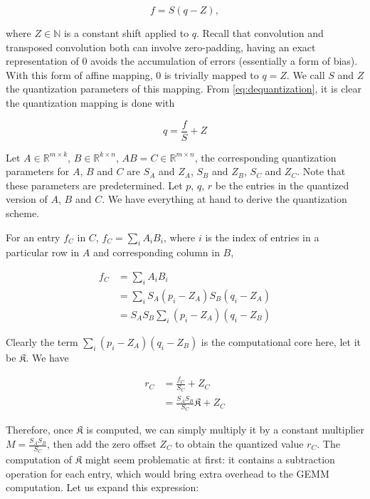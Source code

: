 \begin{equation} \label{eq:dequantization}
  f = S(q - Z),
\end{equation}

where $Z \in \mathbb{N}$ is a constant shift applied to $q$. Recall that convolution and transposed convolution
both can involve zero-padding, having an exact representation of $0$ avoids the accumulation of errors
(essentially a form of bias). With this form of affine mapping, $0$ is trivially mapped to $q = Z$. We call
$S$ and $Z$ the quantization parameters of this mapping. From \ref{eq:dequantization}, it is clear the
quantization mapping is done with

\begin{equation} \label{eq:quantization}
  q = \frac{f}{S} + Z
\end{equation}

Let $A \in \mathbb{R}^{m \times k}$, $B \in \mathbb{R}^{k \times n}$, $A B = C \in \mathbb{R}^{m \times n}$,
the corresponding quantization parameters for $A$, $B$ and $C$ are $S_A$ and $Z_A$, $S_B$ and $Z_B$,
$S_C$ and $Z_C$. Note that these parameters are predetermined. Let $p$, $q$, $r$ be the entries in the
quantized version of $A$, $B$ and $C$. We have everything at hand to derive the quantization scheme.

For an entry $f_C$ in $C$, $f_C = \sum_{i}^{} A_i B_i$, where $i$ is the index of entries in a particular
row in $A$ and corresponding column in $B$,

\begin{equation}
\begin{split}
  f_C & = \sum_{i} A_i B_i \\
      & = \sum_{i} S_A (p_i - Z_A) S_B (q_i - Z_A) \\
      & = S_A S_B \sum_{i} (p_i - Z_A) (q_i - Z_B)
\end{split}
\end{equation}

Clearly the term $\sum_{i} (p_i - Z_A) (q_i - Z_B)$ is the computational core here, let it be
$\mathfrak{K}$. We have

\begin{equation}
\begin{split}
  r_C & = \frac{f_C}{S_C} + Z_C \\
      & = \frac{S_A S_B}{S_C} \mathfrak{K} + Z_C
\end{split}
\end{equation}

Therefore, once $\mathfrak{K}$ is computed, we can simply multiply it by a constant multiplier
$M = \frac{S_A S_B}{S_C}$, then add the zero offset $Z_C$ to obtain the quantized value $r_C$. The computation
of $\mathfrak{K}$ might seem problematic at first: it contains a subtraction operation for each entry,
which would bring extra overhead to the GEMM computation. Let us expand this expression:

